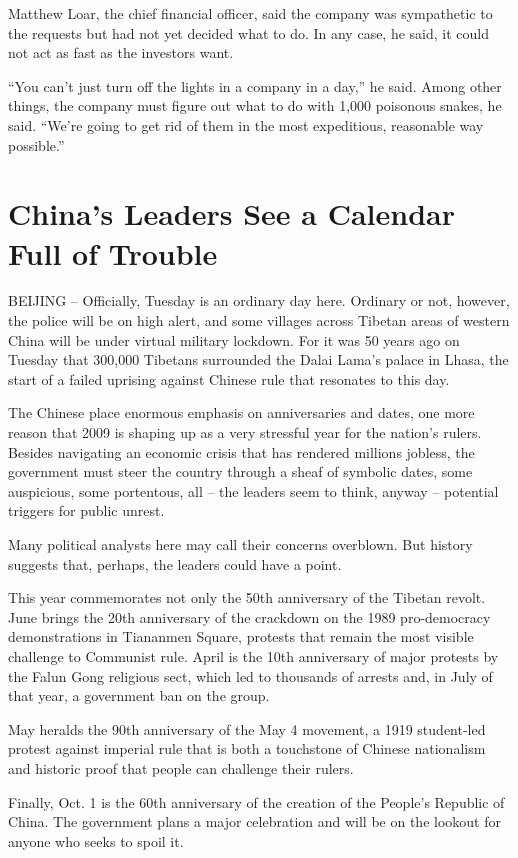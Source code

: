 \documentclass[12pt,a4paper,onecolumn]{article}
\begin{document}
\begin{CJK*}{GBK}{song}
Matthew Loar, the chief financial officer, said the company was sympathetic to the requests but had
not yet decided what to do. In any case, he said, it could not act as fast as the investors want.

``You can't just turn off the lights in a company in a day,'' he said. Among other things, the
company must figure out what to do with 1,000 poisonous snakes, he said. ``We're going to get rid of
them in the most expeditious, reasonable way possible.''

\section{China's Leaders See a Calendar Full of Trouble}

BEIJING -- Officially, Tuesday is an ordinary day here. Ordinary or not, however, the police will be
on high alert, and some villages across Tibetan areas of western China will be under virtual
military lockdown. For it was 50 years ago on Tuesday that 300,000 Tibetans surrounded the Dalai
Lama's palace in Lhasa, the start of a failed uprising against Chinese rule that resonates to this
day.

The Chinese place enormous emphasis on anniversaries and dates, one more reason that 2009 is shaping
up as a very stressful year for the nation's rulers. Besides navigating an economic crisis that has
rendered millions jobless, the government must steer the country through a sheaf of symbolic dates,
some auspicious, some portentous, all -- the leaders seem to think, anyway -- potential triggers for
public unrest.

Many political analysts here may call their concerns overblown. But history suggests that, perhaps,
the leaders could have a point.

This year commemorates not only the 50th anniversary of the Tibetan revolt. June brings the 20th
anniversary of the crackdown on the 1989 pro-democracy demonstrations in Tiananmen Square, protests
that remain the most visible challenge to Communist rule. April is the 10th anniversary of major
protests by the Falun Gong religious sect, which led to thousands of arrests and, in July of that
year, a government ban on the group.

May heralds the 90th anniversary of the May 4 movement, a 1919 student-led protest against imperial
rule that is both a touchstone of Chinese nationalism and historic proof that people can challenge
their rulers.

Finally, Oct. 1 is the 60th anniversary of the creation of the People's Republic of China. The
government plans a major celebration and will be on the lookout for anyone who seeks to spoil it.


\end{CJK*}
\end{document}
